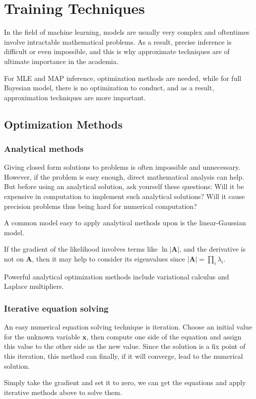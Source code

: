 \documentclass[a4paper]{report}
\renewcommand{\bf}{\mathbf}
\begin{document}
\chapter{Training Techniques}
In the field of machine learning, models are usually very complex and oftentimes involve intractable mathematical problems. As a result, precise inference is difficult or even impossible, and this is why approximate techniques are of ultimate importance in the academia. 

For MLE and MAP inference, optimization methods are needed, while for full Bayesian model, there is no optimization to conduct, and as a result, approximation techniques are more important.
\section{Optimization Methods}
\subsection{Analytical methods} \label{eigen}
Giving closed form solutions to problems is often impossible and unnecessary. However, if the problem is easy enough, direct mathematical analysis can help. But before using an analytical solution, ask yourself these questions: Will it be expensive in computation to implement such analytical solutions? Will it cause precision problems thus being hard for numerical computation?

A common model easy to apply analytical methods upon is the linear-Gaussian model. 

If the gradient of the likelihood involves terms like $\ln|\bf{A}|$, and the derivative is not on $\bf{A}$, then it may help to consider its eigenvalues since $|\bf{A}| = \prod_i \lambda_i$.

Powerful analytical optimization methods include variational calculus and Laplace multipliers.
\subsection{Iterative equation solving}
An easy numerical equation solving technique is iteration. Choose an initial value for the unknown variable $\bf{x}$, then compute one side of the equation and assign this value to the other side as the new value. Since the solution is a fix point of this iteration, this method can finally, if it will converge, lead to the numerical solution.

Simply take the gradient and set it to zero, we can get the equations and apply iterative methods above to solve them.
\end{document}
